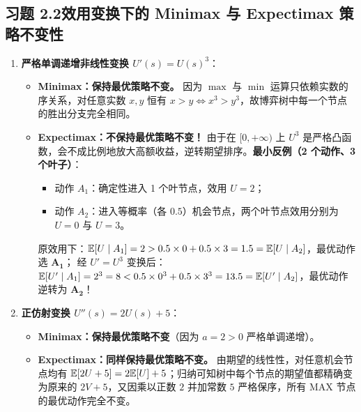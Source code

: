 \subsection*{习题 2.2\quad 效用变换下的 Minimax 与 Expectimax 策略不变性}
\begin{enumerate}[label=(\alph*), leftmargin=1.8em]
  \item \textbf{严格单调递增非线性变换 $U'(s) = U(s)^3$}：
  \begin{itemize}
    \item \textbf{Minimax：保持最优策略不变。} 因为 $\max$ 与 $\min$ 运算只依赖实数的序关系，对任意实数 $x, y$ 恒有 $x > y \iff x^3 > y^3$，故博弈树中每一个节点的胜出分支完全相同。
    \item \textbf{Expectimax：不保持最优策略不变！} 由于在 $[0, +\infty)$ 上 $U^3$ 是严格凸函数，会不成比例地放大高额收益，逆转期望排序。\textbf{最小反例（2 个动作、3 个叶子）}：
    \begin{itemize}
      \item 动作 $A_1$：确定性进入 1 个叶节点，效用 $U = 2$；
      \item 动作 $A_2$：进入等概率（各 $0.5$）机会节点，两个叶节点效用分别为 $U = 0$ 与 $U = 3$。
    \end{itemize}
    原效用下：$\mathbb{E}[U \mid A_1] = 2 > 0.5\times 0 + 0.5\times 3 = 1.5 = \mathbb{E}[U \mid A_2]$，最优动作选 $\mathbf{A_1}$；
    经 $U' = U^3$ 变换后：$\mathbb{E}[U' \mid A_1] = 2^3 = 8 < 0.5\times 0^3 + 0.5\times 3^3 = 13.5 = \mathbb{E}[U' \mid A_2]$，最优动作逆转为 $\mathbf{A_2}$！
  \end{itemize}
  \item \textbf{正仿射变换 $U''(s) = 2 U(s) + 5$}：
  \begin{itemize}
    \item \textbf{Minimax：保持最优策略不变}（因为 $a=2>0$ 严格单调递增）。
    \item \textbf{Expectimax：同样保持最优策略不变。} 由期望的线性性，对任意机会节点均有 $\mathbb{E}[2U + 5] = 2\mathbb{E}[U] + 5$；归纳可知树中每个节点的期望值都精确变为原来的 $2V + 5$，又因乘以正数 $2$ 并加常数 $5$ 严格保序，所有 \textsf{MAX} 节点的最优动作完全不变。
  \end{itemize}
\end{enumerate}


